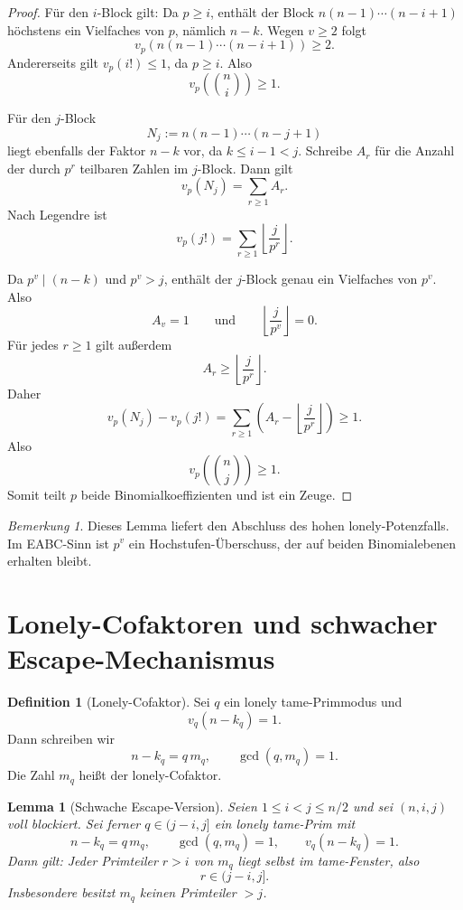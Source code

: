 \documentclass[12pt,a4paper]{article}
\theoremstyle{plain}
\newtheorem{lemma}[theorem]{Lemma}
\theoremstyle{definition}
\newtheorem{definition}[theorem]{Definition}
\theoremstyle{remark}
\newtheorem{remark}[theorem]{Bemerkung}
\begin{document}
	\begin{proof}
		Für den \(i\)-Block gilt: Da \(p\ge i\), enthält der Block \(n(n-1)\cdots(n-i+1)\) höchstens ein Vielfaches von \(p\), nämlich \(n-k\). Wegen \(v\ge2\) folgt
		\[
		v_p\!\left(n(n-1)\cdots(n-i+1)\right)\ge 2.
		\]
		Andererseits gilt \(v_p(i!)\le 1\), da \(p\ge i\). Also
		\[
		v_p\!\left(\binom{n}{i}\right)\ge 1.
		\]
		
		Für den \(j\)-Block
		\[
		N_j:=n(n-1)\cdots(n-j+1)
		\]
		liegt ebenfalls der Faktor \(n-k\) vor, da \(k\le i-1<j\). Schreibe \(A_r\) für die Anzahl der durch \(p^r\) teilbaren Zahlen im \(j\)-Block. Dann gilt
		\[
		v_p(N_j)=\sum_{r\ge1} A_r.
		\]
		Nach Legendre ist
		\[
		v_p(j!)=\sum_{r\ge1}\left\lfloor \frac{j}{p^r}\right\rfloor.
		\]
		
		Da \(p^v\mid (n-k)\) und \(p^v>j\), enthält der \(j\)-Block genau ein Vielfaches von \(p^v\). Also
		\[
		A_v=1
		\qquad\text{und}\qquad
		\left\lfloor \frac{j}{p^v}\right\rfloor=0.
		\]
		Für jedes \(r\ge1\) gilt außerdem
		\[
		A_r\ge \left\lfloor \frac{j}{p^r}\right\rfloor.
		\]
		Daher
		\[
		v_p(N_j)-v_p(j!)
		=
		\sum_{r\ge1}\left(A_r-\left\lfloor\frac{j}{p^r}\right\rfloor\right)\ge 1.
		\]
		Also
		\[
		v_p\!\left(\binom{n}{j}\right)\ge1.
		\]
		Somit teilt \(p\) beide Binomialkoeffizienten und ist ein Zeuge.
	\end{proof}
	
	\begin{remark}
		Dieses Lemma liefert den Abschluss des hohen lonely-Potenzfalls. Im EABC-Sinn ist \(p^v\) ein Hochstufen-Überschuss, der auf beiden Binomialebenen erhalten bleibt.
	\end{remark}
	
	\section{Lonely-Cofaktoren und schwacher Escape-Mechanismus}
	
	\begin{definition}[Lonely-Cofaktor]
		Sei \(q\) ein lonely tame-Primmodus und
		\[
		v_q(n-k_q)=1.
		\]
		Dann schreiben wir
		\[
		n-k_q=q\,m_q,\qquad \gcd(q,m_q)=1.
		\]
		Die Zahl \(m_q\) heißt der lonely-Cofaktor.
	\end{definition}
	
	\begin{lemma}[Schwache Escape-Version]
		\label{lem:weak_escape}
		Seien \(1\le i<j\le n/2\) und sei \((n,i,j)\) voll blockiert. Sei ferner
		\(q\in(j-i,j]\) ein lonely tame-Prim mit
		\[
		n-k_q=q\,m_q,\qquad \gcd(q,m_q)=1,\qquad v_q(n-k_q)=1.
		\]
		Dann gilt: Jeder Primteiler \(r>i\) von \(m_q\) liegt selbst im tame-Fenster,
		also
		\[
		r\in(j-i,j].
		\]
		Insbesondere besitzt \(m_q\) keinen Primteiler \(>j\).
	\end{lemma}
	
\end{document}
